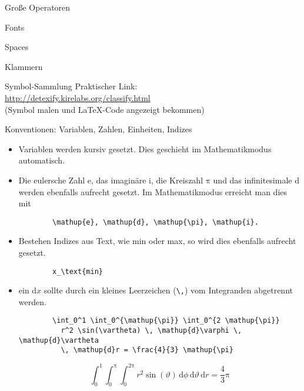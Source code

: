 \begin{frame}{Große Operatoren}
\end{frame}

\begin{frame}{Fonts}
\end{frame}

\begin{frame}{Spaces}
\end{frame}

\begin{frame}{Klammern}
\end{frame}

\begin{frame}[fragile]{
  Symbol-Sammlung
  \hfill{}
}
  Praktischer Link: \\
  \url{http://detexify.kirelabs.org/classify.html} \\
  (Symbol malen und \LaTeX-Code angezeigt bekommen)
\end{frame}

\begin{frame}[fragile]{Konventionen: Variablen, Zahlen, Einheiten, Indizes}
  \begin{itemize}
    \item Variablen werden kursiv gesetzt.
      Dies geschieht im Mathematikmodus automatisch.
    \item Die eulersche Zahl $\mathup{e}$, das imaginäre $\mathup{i}$, die Kreiszahl $\mathup{\pi}$ und das infinitesimale $\mathup{d}$ werden ebenfalls aufrecht gesetzt.
      Im Mathematikmodus erreicht man dies mit
      \begin{lstlisting}
        \mathup{e}, \mathup{d}, \mathup{\pi}, \mathup{i}.
      \end{lstlisting}
    \item Bestehen Indizes aus Text, wie min oder max, so wird dies ebenfalls aufrecht gesetzt.
      \begin{lstlisting}
        x_\text{min}
      \end{lstlisting}
    \item ein $\mathrm{d}x$ sollte durch ein kleines Leerzeichen (\verb+\,+) vom Integranden abgetrennt werden.

      \vspace{5pt}
      \begin{lstlisting}
        \int_0^1 \int_0^{\mathup{\pi}} \int_0^{2 \mathup{\pi}}
          r^2 \sin(\vartheta) \, \mathup{d}\varphi \, \mathup{d}\vartheta
          \, \mathup{d}r = \frac{4}{3} \mathup{\pi}
      \end{lstlisting}

      \begin{equation*}
        \int_0^1 \int_0^{\mathup{\pi}} \int_0^{2 \mathup{\pi}} r^2 \sin(\vartheta) \, \mathup{d}\phi \, \mathup{d}\vartheta \, \mathup{d}r = \frac{4}{3} \mathup{\pi}
      \end{equation*}
  \end{itemize}
\end{frame}
